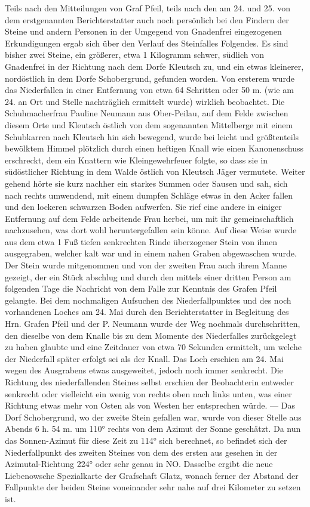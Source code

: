 \documentclass[a4paper, 11pt, oneside]{article}
\begin{document}
Teils nach den Mitteilungen von Graf Pfeil, teils nach den am 24. und 25. von dem erstgenannten Berichterstatter auch noch persönlich bei den Findern der Steine und andern Personen in der Umgegend von Gnadenfrei eingezogenen Erkundigungen ergab sich über den Verlauf des Steinfalles Folgendes. Es sind bisher zwei Steine, ein größerer, etwa 1 Kilogramm schwer, südlich von Gnadenfrei in der Richtung nach dem Dorfe Kleutsch zu, und ein etwas kleinerer, nordöstlich in dem Dorfe Schobergrund, gefunden worden. Von ersterem wurde das Niederfallen in einer Entfernung von etwa 64 Schritten oder 50 m. (wie am 24. an Ort und Stelle nachträglich ermittelt wurde) wirklich beobachtet. Die Schuhmacherfrau Pauline Neumann aus Ober-Peilau, auf dem Felde zwischen diesem Orte und Kleutsch östlich von dem sogenannten Mittelberge mit einem Schubkarren nach Kleutsch hin sich bewegend, wurde bei leicht und größtenteils bewölktem Himmel plötzlich durch einen heftigen Knall wie einen Kanonenschuss erschreckt, dem ein Knattern wie Kleingewehrfeuer folgte, so dass sie in südöstlicher Richtung in dem Walde östlich von Kleutsch Jäger vermutete. Weiter gehend hörte sie kurz nachher ein starkes Summen oder Sausen und sah, sich nach rechts umwendend, mit einem dumpfen Schläge etwas in den Acker fallen und den lockeren schwarzen Boden aufwerfen. Sie rief eine andere in einiger Entfernung auf dem Felde arbeitende Frau herbei, um mit ihr gemeinschaftlich nachzusehen, was dort wohl heruntergefallen sein könne. Auf diese Weise wurde aus dem etwa 1 Fuß tiefen senkrechten Rinde überzogener Stein von ihnen ausgegraben, welcher kalt war und in einem nahen Graben abgewaschen wurde. Der Stein wurde mitgenommen und von der zweiten Frau auch ihrem Manne gezeigt, der ein Stück abschlug und durch den mittels einer dritten Person am folgenden Tage die Nachricht von dem Falle zur Kenntnis des Grafen Pfeil gelangte. Bei dem nochmaligen Aufsuchen des Niederfallpunktes und des noch vorhandenen Loches am 24. Mai durch den Berichterstatter in Begleitung des Hrn. Grafen Pfeil und der P. Neumann wurde der Weg nochmals durchschritten, den dieselbe von dem Knalle bis zu dem Momente des Niederfalles zurückgelegt zu haben glaubte und eine Zeitdauer von etwa 70 Sekunden ermittelt, um welche der Niederfall später erfolgt sei als der Knall. Das Loch erschien am 24. Mai wegen des Ausgrabens etwas ausgeweitet, jedoch noch immer senkrecht. Die Richtung des niederfallenden Steines selbst erschien der Beobachterin entweder senkrecht oder vielleicht ein wenig von rechts oben nach links unten, was einer Richtung etwas mehr von Osten als von Westen her entsprechen würde. --- Das Dorf Schobergrund, wo der zweite Stein gefallen war, wurde von dieser Stelle aus Abends 6 h. 54 m. um 110° rechts von dem Azimut der Sonne geschätzt. Da nun das Sonnen-Azimut für diese Zeit zu 114° sich berechnet, so befindet sich der Niederfallpunkt des zweiten Steines von dem des ersten aus gesehen in der Azimutal-Richtung 224° oder sehr genau in NO. Dasselbe ergibt die neue Liebenowsche Spezialkarte der Grafschaft Glatz, wonach ferner der Abstand der Fallpunkte der beiden Steine voneinander sehr nahe auf drei Kilometer zu setzen ist.
\end{document}

